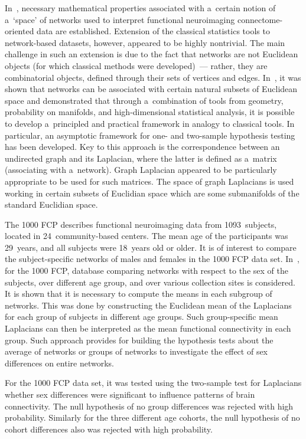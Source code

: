 \begin{multicols}{2}
{}

  In~\cite{64-kl}, necessary mathematical properties associated with a~certain notion
of a~`space' of networks used to interpret functional neuroimaging
  connectome-oriented data are established. Extension of the classical statistics tools
to network-based datasets, however, appeared to be highly nontrivial. The main
challenge in such an extension is due to the fact that networks are not Euclidean
objects (for which classical methods were developed)~--- rather, they are
combinatorial objects, defined through their sets of vertices and edges.
  In~\cite{64-kl}, it was shown that networks can be associated with certain natural
subsets of Euclidean space and demonstrated that through a~combination of tools
from geometry, probability on manifolds, and high-dimensional statistical analysis, it
is possible to develop a~principled and practical framework in analogy to classical
tools. In particular, an asymptotic framework for one- and two-sample hypothesis
testing has been developed. Key to this approach is the correspondence between an
undirected graph and its Laplacian, where the latter is defined as a~matrix (associating
with a~network). Graph Laplacian appeared to be particularly appropriate to be used
for such matrices. The space of graph Laplacians is used working in certain subsets of
Euclidian space which are some submanifolds of the standard Euclidian space.

  The 1000 FCP describes functional neuroimaging data from 1093~subjects,
located in 24~community-based centers. The mean age of the participants was
29~years, and all subjects were 18~years old or older. It is of interest to compare the
subject-specific networks of males and females in the 1000 FCP data set.
  In~\cite{64-kl},  for the 1000 FCP, database comparing networks with respect to
the sex of the subjects, over different age group, and over various collection sites is
considered. It is shown that it is necessary to compute the means in each subgroup of
networks. This was done by constructing the Euclidean mean of the Laplacians for
each group of subjects in different age groups. Such group-specific mean Laplacians
can then be interpreted as the mean functional connectivity in each group. Such
approach provides for building the hypothesis tests about the average of networks or
groups of networks to investigate the effect of sex differences on entire networks.

  For the 1000 FCP data set, it was tested using the two-sample test for Laplacians
whether sex differences were significant to influence patterns of brain connectivity.
The null hypothesis of no group differences was rejected with high probability.
Similarly for the three different age cohorts, the null hypothesis of no cohort
differences also was rejected with high probability.


\end{multicols}
